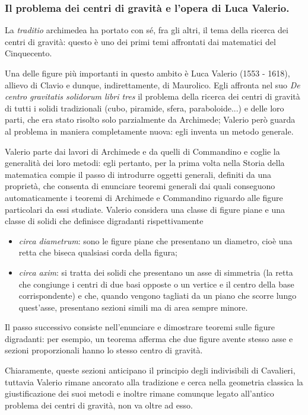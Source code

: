 \subsubsection{Il problema dei centri di gravit\`a e l'opera di Luca Valerio.}\label{IlProblemaDeiCentriDiGravitaELOperaDiLucaValerio}
\par La \textit{traditio} archimedea ha portato con s\'e, fra gli altri, il tema della ricerca dei centri di gravit\`a: questo \`e uno dei primi temi affrontati dai matematici del Cinquecento.
\par Una delle figure pi\`u importanti in questo ambito \`e Luca Valerio (1553 - 1618), allievo di Clavio e dunque, indirettamente, di Maurolico. Egli affronta nel suo \textit{De centro gravitatis solidorum libri tres} il problema della ricerca dei centri di gravit\`a di tutti i solidi tradizionali (cubo, piramide, sfera, paraboloide...) e delle loro parti, che era stato risolto solo parzialmente da Archimede; Valerio per\`o guarda al problema in maniera completamente nuova: egli inventa un metodo generale.
\par Valerio parte dai lavori di Archimede e da quelli di Commandino e coglie la generalit\`a dei loro metodi: egli pertanto, per la prima volta nella Storia della matematica compie il passo di introdurre oggetti generali, definiti da una propriet\`a, che consenta di enunciare teoremi generali dai quali conseguono automaticamente i teoremi di Archimede e Commandino riguardo alle figure particolari da essi studiate. Valerio considera una classe di figure piane e una classe di solidi che definisce digradanti rispettivamente
\begin{itemize}
	\item \textit{circa diametrum}: sono le figure piane che presentano un diametro, cio\`e una retta che biseca qualsiasi corda della figura;
	\item \textit{circa axim}: si tratta dei solidi che presentano un asse di simmetria (la retta che congiunge i centri di due basi opposte o un vertice e il centro della base corrispondente) e che, quando vengono tagliati da un piano che scorre lungo quest'asse, presentano sezioni simili ma di area sempre minore.
\end{itemize}
\par Il passo successivo consiste nell'enunciare e dimostrare teoremi sulle figure digradanti: per esempio, un teorema afferma che due figure avente stesso asse e sezioni proporzionali hanno lo stesso centro di gravit\`a.
\par Chiaramente, queste sezioni anticipano il principio degli indivisibili di Cavalieri, tuttavia Valerio rimane ancorato alla tradizione e cerca nella geometria classica la giustificazione dei suoi metodi e inoltre rimane comunque legato all'antico problema dei centri di gravit\`a, non va oltre ad esso.
